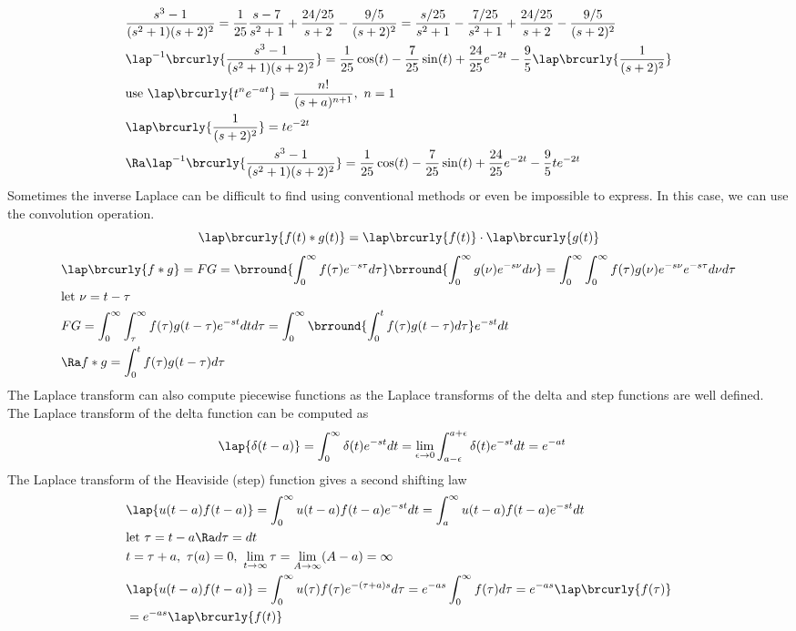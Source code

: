\begin{align*}
    &\frac{s^3-1}{(s^2+1)(s+2)^2}=\frac{1}{25}\frac{s-7}{s^2+1}+\frac{24/25}{s+2}-\frac{9/5}{(s+2)^2}=\frac{s/25}{s^2+1}-\frac{7/25}{s^2+1}+\frac{24/25}{s+2}-\frac{9/5}{(s+2)^2}\\
    &\lap^{-1}\brcurly{\frac{s^3-1}{(s^2+1)(s+2)^2}}=\frac{1}{25}\cos(t)-\frac{7}{25}\sin(t)+\frac{24}{25}e^{-2t}-\frac{9}{5}\lap\brcurly{\frac{1}{(s+2)^2}}\\
    &\text{use }\lap\brcurly{t^ne^{-at}}=\frac{n!}{(s+a)^{n+1}},\ n=1\\
    &\lap\brcurly{\frac{1}{(s+2)^2}}=te^{-2t}\\
    &\Ra \lap^{-1}\brcurly{\frac{s^3-1}{(s^2+1)(s+2)^2}}=\frac{1}{25}\cos(t)-\frac{7}{25}\sin(t)+\frac{24}{25}e^{-2t}-\frac{9}{5}te^{-2t}
\end{align*}
Sometimes the inverse Laplace can be difficult to find using conventional methods or even be impossible to express. In this case, we can use the convolution operation.\\
$$\lap\brcurly{f(t)*g(t)}=\lap\brcurly{f(t)}\cdot\lap\brcurly{g(t)}$$
\begin{align*}
    &\lap\brcurly{f*g}=FG=\brround{\int_0^\infty f(\tau)e^{-s\tau}d\tau}\brround{\int_0^\infty g(\nu)e^{-s\nu}d\nu}=\int_0^\infty\int_0^\infty f(\tau)g(\nu)e^{-s\nu}e^{-s\tau}d\nu d\tau\\
    &\text{let }\nu=t-\tau\\
    &FG=\int_0^\infty\int_\tau^\infty f(\tau) g(t-\tau)e^{-st}dtd\tau=\int_0^\infty\brround{\int_0^t f(\tau) g(t-\tau)d\tau}e^{-st}dt\\
    &\Ra f*g=\int_0^t f(\tau)g(t-\tau)d\tau
\end{align*}
The Laplace transform can also compute piecewise functions as the Laplace transforms of the delta and step functions are well defined.\\
The Laplace transform of the delta function can be computed as
\begin{align*}
    &\lap\{\delta(t-a)\}=\int_0^\infty\delta(t)e^{-st}dt=\lim_{\epsilon\to0}\int_{a-\epsilon}^{a+\epsilon}\delta(t)e^{-st}dt=e^{-at}
\end{align*}
The Laplace transform of the Heaviside (step) function gives a second shifting law
\begin{align*}
    &\lap\{u(t-a)f(t-a)\}=\int_0^\infty u(t-a)f(t-a)e^{-st}dt=\int_a^\infty u(t-a)f(t-a)e^{-st}dt\\
    &\text{let }\tau=t-a\Ra d\tau=dt\\
    &t=\tau+a,\ \tau(a)=0,\ \lim_{t\to\infty}\tau=\lim_{A\to\infty}(A-a)=\infty\\
    &\lap\{u(t-a)f(t-a)\}=\int_0^\infty u(\tau)f(\tau)e^{-(\tau+a)s}d\tau=e^{-as}\int_0^\infty f(\tau)d\tau=e^{-as}\lap\brcurly{f(\tau)}\\
    &=e^{-as}\lap\brcurly{f(t)}
\end{align*}
